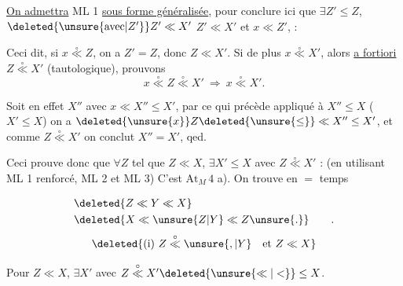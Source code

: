 \uline{On admettra} ML 1 \uline{sous forme généralisée}, pour conclure ici que $\exists Z'\leq Z$, $\deleted{\unsure{\text{avec}|Z'}}Z'\ll X'$ $Z'\ll X'$ et $x\ll Z'$, :

Ceci dit, si $x\overset{\circ}{\ll}Z$, on a $Z'=Z$, donc $Z\ll X'$. Si de plus $x\overset{\circ}{\ll}X'$, alors \uline{a fortiori}  $Z\overset{\circ}{\ll}X'$ (tautologique), prouvons  
\[
x\overset{\circ}{\ll}Z\overset{\circ}{\ll}X'\ \Longrightarrow\ x\overset{\circ}{\ll}X'.
\]

Soit en effet  $X''$ avec $x\ll X''\leq X'$, par ce qui précède appliqué à $X''\leq X$ ( $X'\leq X$) on a $\deleted{\unsure{x}}Z\deleted{\unsure{\leq}}\ll X''\leq X'$, et comme $Z\overset{\circ}{\ll}X'$ on conclut $X''=X'$, qed.

Ceci prouve donc que $\forall Z$ \deleted{\unsure{$\in$}}tel que $Z\ll X$, $\exists X'\leq X$ avec $Z\overset{\circ}{\ll}X'$ : (en utilisant ML 1 renforcé, ML 2 et ML 3) C'est $\mathrm{At}_{M}\,4$ a). On trouve en $=$ temps

\[
\begin{aligned}
&\deleted{Z\ll Y\ll X}\\
&\deleted{X\ll\unsure{Z|Y}\ll Z\unsure{.}}\qquad .
\end{aligned}
\]
\[
\deleted{\text{(i) }Z\overset{\circ}{\ll}\unsure{,|Y}\quad\text{et }Z\ll X}
\]

 Pour $Z\ll X$, $\exists X'$ avec $Z\overset{\circ}{\ll}X'\deleted{\unsure{\ll|<}}\leq X$.

